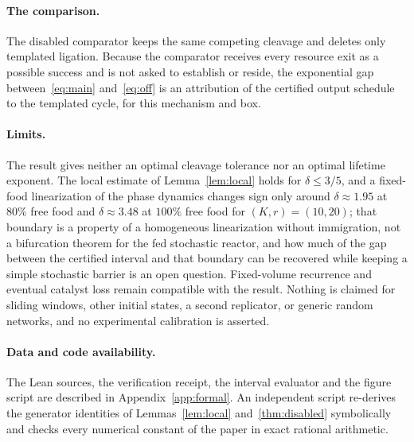 \documentclass[11pt,a4paper]{article}
\theoremstyle{plain}
\theoremstyle{definition}
\theoremstyle{remark}
\begin{document}
\paragraph{The comparison.}
The disabled comparator keeps the same competing cleavage and deletes only templated ligation. Because the comparator receives every resource exit as a possible success and is not asked to establish or reside, the exponential gap between~\eqref{eq:main} and~\eqref{eq:off} is an attribution of the certified output schedule to the templated cycle, for this mechanism and box.

\paragraph{Limits.}
The result gives neither an optimal cleavage tolerance nor an optimal lifetime exponent. The local estimate of Lemma~\ref{lem:local} holds for $\delta\le3/5$, and a fixed-food linearization of the phase dynamics changes sign only around $\delta\approx1.95$ at $80\%$ free food and $\delta\approx3.48$ at $100\%$ free food for $(K,r)=(10,20)$; that boundary is a property of a homogeneous linearization without immigration, not a bifurcation theorem for the fed stochastic reactor, and how much of the gap between the certified interval and that boundary can be recovered while keeping a simple stochastic barrier is an open question. Fixed-volume recurrence and eventual catalyst loss remain compatible with the result. Nothing is claimed for sliding windows, other initial states, a second replicator, or generic random networks, and no experimental calibration is asserted.

\paragraph{Data and code availability.}
The Lean sources, the verification receipt, the interval evaluator and the figure script are described in Appendix~\ref{app:formal}. An independent script re-derives the generator identities of Lemmas~\ref{lem:local} and~\ref{thm:disabled} symbolically and checks every numerical constant of the paper in exact rational arithmetic.

\appendix
\end{document}
